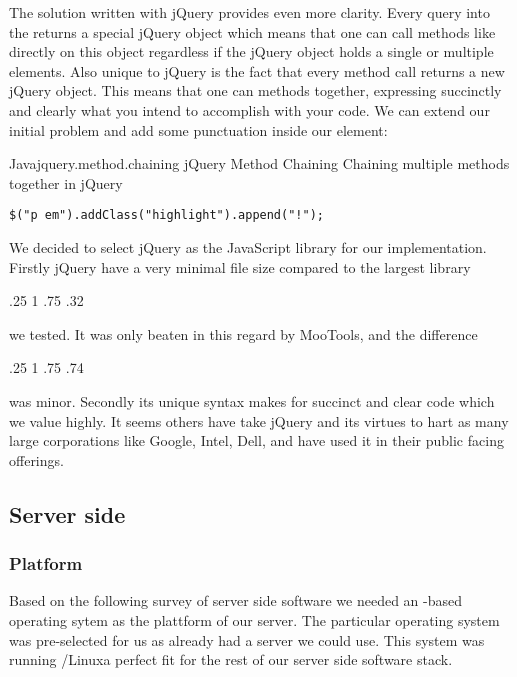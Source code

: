 The solution written with jQuery provides even more clarity.
Every query into the  returns a special jQuery object which means
that one can call methods like  directly on this object
regardless if the jQuery object holds a single or multiple elements.
Also unique to jQuery is the fact that every method call returns a new jQuery
object. This means that one can  methods together, expressing
succinctly and clearly what you intend to accomplish with your code. We can
extend our initial problem and add some punctuation inside our 
element:

\begin{scode}{Java}{jquery.method.chaining}{%
  jQuery Method Chaining}{%
  Chaining multiple methods together in jQuery}
\begin{lstlisting}
$("p em").addClass("highlight").append("!");
\end{lstlisting}
\end{scode}

We decided to select jQuery as the JavaScript library for our implementation.
Firstly jQuery have a very minimal file size compared to the largest library
\begin{sparkline}{3}
  \sparkspike .25  1
  \sparkspike .75  .32
\end{sparkline}
we tested. It was only beaten in this regard by MooTools, and the difference
\begin{sparkline}{3}
  \sparkspike .25  1
  \sparkspike .75  .74
\end{sparkline}
was minor. Secondly its unique syntax makes for succinct and clear code
which we value highly.
It seems others have take jQuery and its
virtues to hart as many large corporations like Google, Intel, Dell, and
 have used it in their public facing offerings.%

\subsection{Server side}

\subsubsection{Platform}

Based on the following survey of server side software we needed an
-based operating sytem as the plattform of our server. The
particular operating system was pre-selected for us as  already
had a server we could use. This system was running %
/Linux\dash{}a perfect fit for the rest of our server side
software stack.

